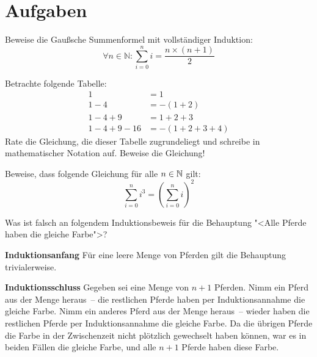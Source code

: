 \section*{Aufgaben}

\begin{aufgabe}
Beweise die Gaußsche
Summenformel mit vollständiger Induktion:
\[\forall n\in\mathbb{N}: \sum_{i=0}^n i =
  \frac{n\times(n+1)}{2}\]
\end{aufgabe}

\begin{aufgabe}
  Betrachte folgende Tabelle:
  \begin{displaymath}
    \begin{split}
    1 &= 1\\
    1-4&= -(1+2)\\
    1-4+9&= 1+2+3\\
    1-4+9-16&= -(1+2+3+4)
  \end{split}
\end{displaymath}  %
  Rate die Gleichung, die dieser Tabelle zugrundeliegt und
  schreibe in mathematischer Notation auf.  Beweise die Gleichung!
\end{aufgabe}

\begin{aufgabe}
  Beweise, dass folgende Gleichung für alle $n\in\mathbb{N}$ gilt:
  \begin{displaymath}
    \sum_{i=0}^n i^3 = \left(\sum_{i=0}^n i\right)^2
  \end{displaymath}
\end{aufgabe}

\begin{aufgabe}
  Was ist falsch an folgendem Induktionsbeweis für die Behauptung "<Alle Pferde haben die gleiche Farbe">?

  \noindent\textbf{Induktionsanfang} Für eine leere Menge von Pferden gilt die
    Behauptung trivialerweise.
    
    \noindent\textbf{Induktionsschluss} Gegeben sei eine Menge von $n+1$ Pferden.
    Nimm ein Pferd aus der Menge heraus~-- die restlichen Pferde haben per
    Induktionsannahme die gleiche Farbe.  Nimm ein anderes Pferd aus
    der Menge heraus~-- wieder haben die restlichen Pferde per
    Induktionsannahme die gleiche Farbe.  Da die übrigen Pferde die
    Farbe in der Zwischenzeit nicht plötzlich gewechselt haben können, war es in beiden Fällen
    die gleiche Farbe, und alle $n+1$ Pferde haben diese Farbe.
\end{aufgabe}


